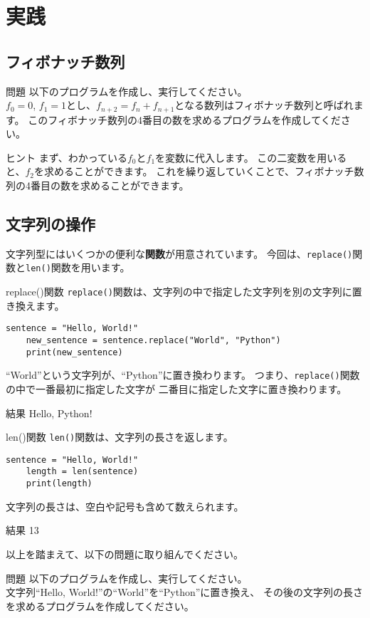 \documentclass[a4paper,titlepage,dvipdfmx]{jarticle}
\begin{document}
\section{実践}
\subsection{フィボナッチ数列}
\begin{itembox}[l]{問題}
  以下のプログラムを作成し、実行してください。\\
  $f_{0}=0$, $f_{1}=1$とし、$f_{n+2}=f_{n}+f_{n+1}$となる数列はフィボナッチ数列と呼ばれます。
  このフィボナッチ数列の4番目の数を求めるプログラムを作成してください。
\end{itembox}
\begin{itembox}[l]{ヒント}
  まず、わかっている$f_{0}$と$f_{1}$を変数に代入します。
  この二変数を用いると、$f_{2}$を求めることができます。
  これを繰り返していくことで、フィボナッチ数列の4番目の数を求めることができます。
\end{itembox}
\subsection{文字列の操作}
文字列型にはいくつかの便利な\textbf{関数}が用意されています。
今回は、\texttt{replace()}関数と\texttt{len()}関数を用います。
\begin{itembox}[l]{replace()関数}
  \texttt{replace()}関数は、文字列の中で指定した文字列を別の文字列に置き換えます。
  \begin{lstlisting}[caption=replace()関数,label=replace()関数]
    sentence = "Hello, World!"
    new_sentence = sentence.replace("World", "Python")
    print(new_sentence)
  \end{lstlisting}
  ``World''という文字列が、``Python''に置き換わります。
  つまり、\texttt{replace()}関数の中で一番最初に指定した文字が
  二番目に指定した文字に置き換わります。
  \begin{itembox}[l]{結果}
    Hello, Python!
  \end{itembox}
\end{itembox}
\begin{itembox}[l]{len()関数}
  \texttt{len()}関数は、文字列の長さを返します。
  \begin{lstlisting}[caption=len()関数,label=len()関数]
    sentence = "Hello, World!"
    length = len(sentence)
    print(length)
  \end{lstlisting}
  文字列の長さは、空白や記号も含めて数えられます。
  \begin{itembox}[l]{結果}
    13
  \end{itembox}
\end{itembox}
以上を踏まえて、以下の問題に取り組んでください。
\begin{itembox}[l]{問題}
  以下のプログラムを作成し、実行してください。\\
  文字列``Hello, World!''の``World''を``Python''に置き換え、
  その後の文字列の長さを求めるプログラムを作成してください。
\end{itembox}
\end{document}
